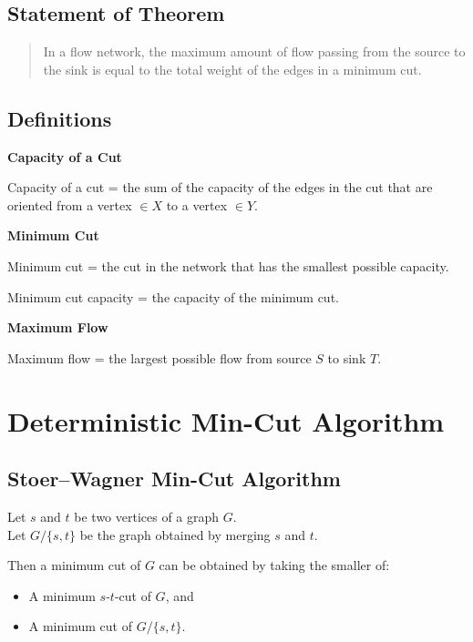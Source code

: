 \documentclass[12pt]{article}
\begin{document}
\subsection*{Statement of Theorem}

\begin{quote}
In a flow network, the maximum amount of flow passing from the source to the sink is equal to the total weight of the edges in a minimum cut.
\end{quote}

\subsection*{Definitions}

\textbf{Capacity of a Cut}

Capacity of a cut = the sum of the capacity of the edges in the cut that are oriented from a vertex \( \in X \) to a vertex \( \in Y \).

\medskip

\textbf{Minimum Cut}

Minimum cut = the cut in the network that has the smallest possible capacity.

Minimum cut capacity = the capacity of the minimum cut.

\medskip

\textbf{Maximum Flow}

Maximum flow = the largest possible flow from source \( S \) to sink \( T \).

\section{Deterministic Min-Cut Algorithm}

\subsection{Stoer--Wagner Min-Cut Algorithm}

Let \( s \) and \( t \) be two vertices of a graph \( G \). \\
Let \( G/\{s, t\} \) be the graph obtained by merging \( s \) and \( t \).

Then a minimum cut of \( G \) can be obtained by taking the smaller of:

\begin{itemize}
\item A minimum \( s\text{-}t \)-cut of \( G \), and
\item A minimum cut of \( G/\{s, t\} \).
\end{itemize}
\end{document}
